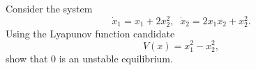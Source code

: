 \question[20]
%
Consider the system \[ \dot{x}_1 = x_1 + 2x_2^2, \;\; \dot{x}_2 = 2x_1x_2 +
x_2^2. \] Using the Lyapunov function candidate \[ V(x) = x_1^2 - x_2^2, \] show 
that $0$ is an unstable equilibrium.